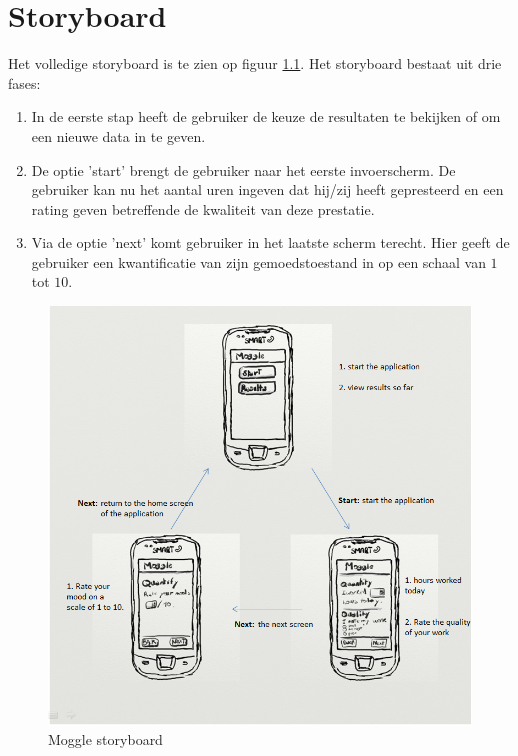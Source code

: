 \chapter{Storyboard}\label{chapter:storyboard}

Het volledige storyboard is te zien op figuur \ref{fig:storyboard}. Het storyboard bestaat uit drie fases:

\begin{enumerate}
	\item In de eerste stap heeft de gebruiker de keuze de resultaten te bekijken of om een nieuwe data in te geven.
	\item De optie 'start' brengt de gebruiker naar het eerste invoerscherm. De gebruiker kan nu het aantal uren ingeven dat hij/zij heeft gepresteerd en een rating geven betreffende de kwaliteit van deze prestatie.
	\item Via de optie 'next' komt gebruiker in het laatste scherm terecht. Hier geeft de gebruiker een kwantificatie van zijn gemoedstoestand in op een schaal van $1$ tot $10$.
\end{enumerate}

\begin{figure}
  \begin{center}
  \includegraphics[scale=0.6]{data/storyboard-final}
	\end{center}
  \caption{Moggle storyboard}
	\label{fig:storyboard}
\end{figure}
